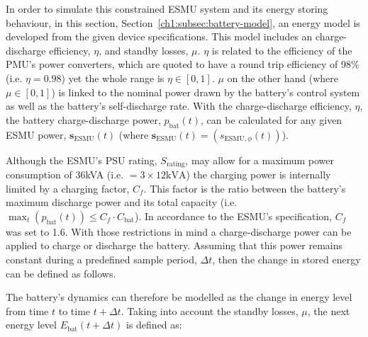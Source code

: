 In order to simulate this constrained ESMU system and its energy storing behaviour, in this section, Section~\ref{ch1:subsec:battery-model}, an energy model is developed from the given device specifications.
This model includes an charge-discharge efficiency, $\eta$, and standby losses, $\mu$.
$\eta$ is related to the efficiency of the PMU's power converters, which are quoted to have a round trip efficiency of 98\% (i.e. $\eta = 0.98$) yet the whole range is $\eta \in [0, 1]$.
$\mu$ on the other hand (where $\mu \in [0, 1]$) is linked to the nominal power drawn by the battery's control system as well as the battery's self-discharge rate.
With the charge-discharge efficiency, $\eta$, the battery charge-discharge power, $p_\text{bat}(t)$, can be calculated for any given ESMU power, $\textbf{s}_\text{ESMU}(t)$ (where $\textbf{s}_\text{ESMU}(t) = (s_{\text{ESMU},\phi}(t))$).




Although the ESMU's PSU rating, $S_\text{rating}$, may allow for a maximum power consumption of 36kVA (i.e. $=3\times12\text{kVA}$) the charging power is internally limited by a charging factor, $C_f$.
This factor is the ratio between the battery's maximum discharge power and its total capacity (i.e. $\max_t (p_\text{bat}(t)) \leq C_f \cdot C_\text{bat}$).
In accordance to the ESMU's specification, $C_f$ was set to 1.6.
With those restrictions in mind a charge-discharge power can be applied to charge or discharge the battery.
Assuming that this power remains constant during a predefined sample period, $\Delta t$, then the change in stored energy can be defined as follows.



\nomenclature[I]{$\mu$}{Self-discharge losses of battery, where $\mu \in (0, 1]$}

The battery's dynamics can therefore be modelled as the change in energy level from time $t$ to time $t+\Delta t$.
Taking into account the standby losses, $\mu$, the next energy level $E_\text{bat}(t+\Delta t)$ is defined as:



